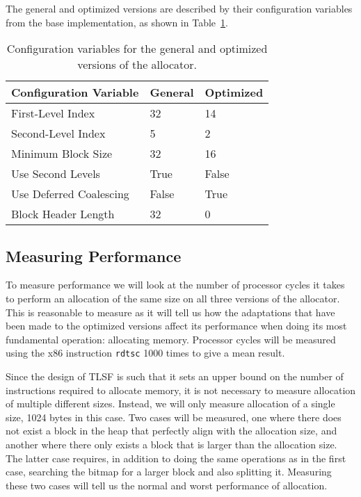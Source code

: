 The general and optimized versions are described by their configuration variables from the base implementation, as shown in Table~\ref{table:configuration-variables}.

\begin{table}[H]
\centering
\begin{tabular}{lllll}
\hline
Configuration Variable  & General  & \multicolumn{3}{l}{Optimized} \\ \hline
First-Level Index       & 32       & \multicolumn{3}{l}{14}        \\
Second-Level Index      & 5        & \multicolumn{3}{l}{2}         \\
Minimum Block Size      & 32       & \multicolumn{3}{l}{16 }       \\
Use Second Levels       & True     & \multicolumn{3}{l}{False}     \\
Use Deferred Coalescing & False    & \multicolumn{3}{l}{True}      \\
Block Header Length     & 32       & \multicolumn{3}{l}{0}        
\end{tabular}
\caption{Configuration variables for the general and optimized versions of the allocator.}
\label{table:configuration-variables}
\end{table}

\subsection{Measuring Performance}

To measure performance we will look at the number of processor cycles it takes to perform an allocation of the same size on all three versions of the allocator. This is reasonable to measure as it will tell us how the adaptations that have been made to the optimized versions affect its performance when doing its most fundamental operation: allocating memory. Processor cycles will be measured using the x86 instruction \texttt{rdtsc} 1000 times to give a mean result. 

Since the design of TLSF is such that it sets an upper bound on the number of instructions required to allocate memory, it is not necessary to measure allocation of multiple different sizes. Instead, we will only measure allocation of a single size, 1024 bytes in this case. Two cases will be measured, one where there does not exist a block in the heap that perfectly align with the allocation size, and another where there only exists a block that is larger than the allocation size. The latter case requires, in addition to doing the same operations as in the first case, searching the bitmap for a larger block and also splitting it. Measuring these two cases will tell us the normal and worst performance of allocation.

